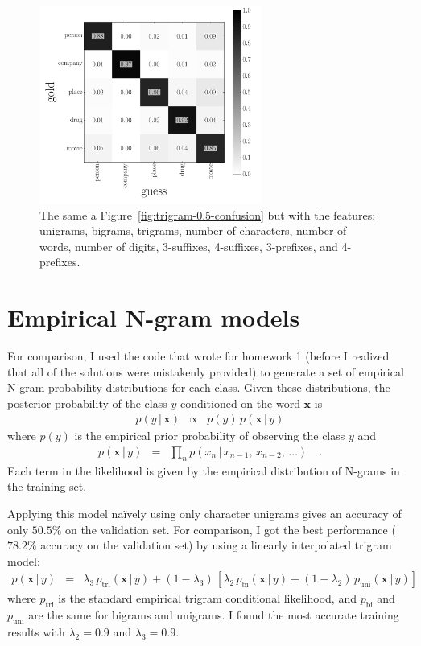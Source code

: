 \documentclass[11pt]{article}
\newcommand{\fig}[1]{Figure~\ref{fig:#1}}
\newcommand{\figlabel}[1]{\label{fig:#1}}
\newcommand{\bvec}[1]{\ensuremath{\boldsymbol{#1}}}
\begin{document}
\begin{figure}[htbp]
\begin{center}
    \includegraphics[width=0.65\textwidth]{final/insane_0_5_confusion.pdf}
\end{center}
\caption{%
The same a \fig{trigram-0.5-confusion} but with the features: unigrams,
bigrams, trigrams, number of characters, number of words, number of digits,
3-suffixes, 4-suffixes, 3-prefixes, and 4-prefixes.
\figlabel{insane-0.5-confusion}}
\end{figure}

\clearpage

\section{Empirical N-gram models}

For comparison, I used the code that wrote for homework 1 (before I realized
that all of the solutions were mistakenly provided) to generate a set of
empirical N-gram probability distributions for each class.
Given these distributions, the posterior probability of the class $y$
conditioned on the word $\bvec{x}$ is
\begin{eqnarray}
p(y\,|\,\bvec{x}) &\propto& p(y)\,p(\bvec{x}\,|\,y)
\end{eqnarray}
where $p(y)$ is the empirical prior probability of observing the class $y$ and
\begin{eqnarray}
p(\bvec{x}\,|\,y) &=& \prod_{n} p(x_n\,|\,x_{n-1},\,x_{n-2},\,\ldots) \quad.
\end{eqnarray}
Each term in the likelihood is given by the empirical distribution of N-grams
in the training set.

Applying this model na\"ively using only character unigrams gives an accuracy
of only $50.5\%$ on the validation set.
For comparison, I got the best performance ($78.2\%$ accuracy on the
validation set) by using a linearly interpolated trigram model:
\begin{eqnarray}
p(\bvec{x}\,|\,y) &=& \lambda_3\,p_\mathrm{tri}(\bvec{x}\,|\,y)
+(1-\lambda_3)\,\left [\lambda_2\,p_\mathrm{bi}(\bvec{x}\,|\,y)
+(1-\lambda_2)\,p_\mathrm{uni}(\bvec{x}\,|\,y)\right]
\end{eqnarray}
where $p_\mathrm{tri}$ is the standard empirical trigram conditional
likelihood, and $p_\mathrm{bi}$ and $p_\mathrm{uni}$ are the same for bigrams
and unigrams.
I found the most accurate training results with $\lambda_2=0.9$ and
$\lambda_3=0.9$.
\end{document}
